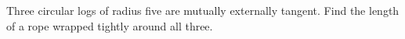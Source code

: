 Three circular logs of radius five are mutually externally tangent. Find the length of a rope wrapped tightly around all three.
